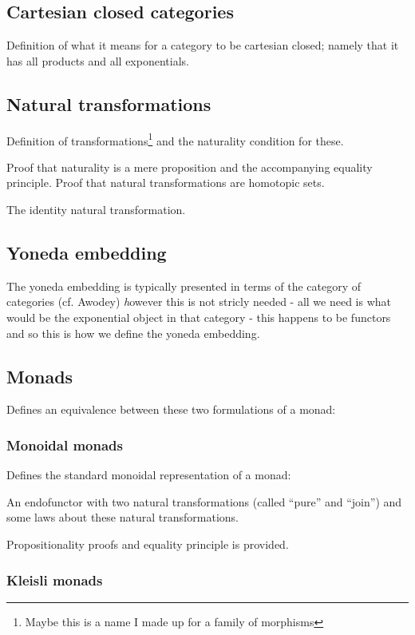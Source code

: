 \subsection{Cartesian closed categories}
Definition of what it means for a category to be cartesian closed; namely that
it has all products and all exponentials.

\subsection{Natural transformations}
Definition of transformations\footnote{Maybe this is a name I made up for a
  family of morphisms} and the naturality condition for these.

Proof that naturality is a mere proposition and the accompanying equality
principle. Proof that natural transformations are homotopic sets.

The identity natural transformation.

\subsection{Yoneda embedding}

The yoneda embedding is typically presented in terms of the category of
categories (cf. Awodey) \emph however this is not stricly needed - all we need
is what would be the exponential object in that category - this happens to be
functors and so this is how we define the yoneda embedding.

\subsection{Monads}

Defines an equivalence between these two formulations of a monad:

\subsubsection{Monoidal monads}

Defines the standard monoidal representation of a monad:

An endofunctor with two natural transformations (called ``pure'' and ``join'')
and some laws about these natural transformations.

Propositionality proofs and equality principle is provided.

\subsubsection{Kleisli monads}

